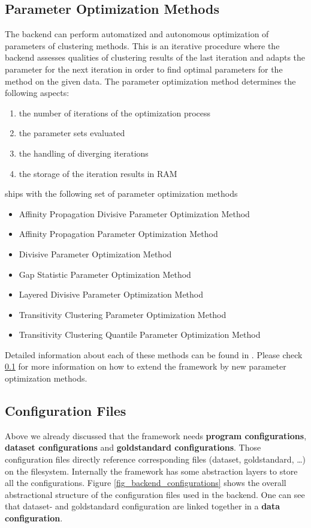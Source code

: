 	\subsection{Parameter Optimization Methods}\label{paramOptMethods}
	 The backend can perform automatized and autonomous optimization of parameters of clustering methods. This is an iterative procedure where the backend assesses qualities of clustering results of the last iteration and adapts the parameter for the next iteration in order to find optimal parameters for the method on the given data. The parameter optimization method determines the following aspects:

\begin{enumerate}
\item the number of iterations of the optimization process
\item the parameter sets evaluated
\item the handling of diverging iterations
\item the storage of the iteration results in RAM
\end{enumerate}


	\clusteval ships with the following set of parameter optimization methods
	\begin{itemize}
		\item Affinity Propagation Divisive Parameter Optimization Method
		\item Affinity Propagation Parameter Optimization Method
		\item Divisive Parameter Optimization Method
		\item Gap Statistic Parameter Optimization Method
		\item Layered Divisive Parameter Optimization Method
		\item Transitivity Clustering Parameter Optimization Method
		\item Transitivity Clustering Quantile Parameter Optimization Method
	\end{itemize}
	Detailed information about each of these methods can be found in \cite{wiwie_2013}. Please check \ref{paramOptMethods} for more information on how to extend the framework by new parameter optimization methods.
	

	
	\subsection{Configuration Files}
	Above we already discussed that the framework needs \textbf{program configurations}, \textbf{dataset configurations} and \textbf{goldstandard configurations}. Those configuration files directly reference corresponding files (dataset, goldstandard, \ldots) on the filesystem. Internally the framework has some abstraction layers to store all the configurations. Figure \ref{fig_backend_configurations} shows the overall abstractional structure of the configuration files used in the backend. One can see that dataset- and goldstandard configuration are linked together in a \textbf{data configuration}.
	
